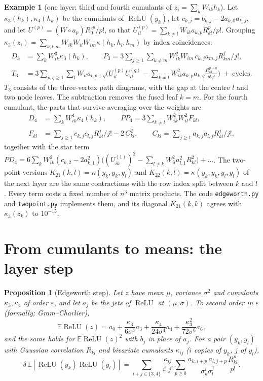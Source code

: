 \documentclass[11pt]{article}
\newtheorem{proposition}[theorem]{Proposition}
\theoremstyle{definition}
\newtheorem{example}[theorem]{Example}
\theoremstyle{remark}
\newcommand{\E}{\mathbb E}
\newcommand{\relu}{\operatorname{ReLU}}
\begin{document}
\begin{example}[one layer: third and fourth cumulants of $z_i=\sum_kW_{ik}h_k$]\label{ex:k3k4}
Let $\kappa_3(h_k),\kappa_4(h_k)$ be the cumulants of $\relu(y_k)$, let $c_{k,j}=b_{k,j}-2a_{k,0}a_{k,j}$, and let $U^{(p)}=(W\circ a_p)R_0^{\circ p}/p!$, so that $U^{(p)}_{il}=\sum_{k\ne l}W_{ik}a_{k,p}R_{kl}^p/p!$. Grouping $\kappa_3(z_i)=\sum_{k,l,m}W_{ik}W_{il}W_{im}\kappa(h_k,h_l,h_m)$ by index coincidences:
\begin{align*}
D_3&=\textstyle\sum_kW_{ik}^3\kappa_3(h_k),\qquad
P_3=3\sum_{j\ge1}\sum_{k\ne m}W_{ik}^2W_{im}\,c_{k,j}a_{m,j}R_{km}^j/j!,\\
T_3&=\textstyle 3\sum_{p,q\ge1}\sum_lW_{il}a_{l,p+q}\Big(U^{(p)}_{il}U^{(q)}_{il}-\sum_{k\ne l}W_{ik}^2a_{k,p}a_{k,q}\frac{R_{kl}^{p+q}}{p!q!}\Big)\ +\ \text{cycles}.
\end{align*}
$T_3$ consists of the three-vertex path diagrams, with the gap at the centre $l$ and two node leaves. The subtraction removes the fused leaf $k=m$. For the fourth cumulant, the parts that survive averaging over the weights are
\begin{align*}
D_4&=\textstyle\sum_kW_{ik}^4\kappa_4(h_k),\qquad PP_4=3\sum_{k\ne l}W_{ik}^2W_{il}^2F_{kl},\\
F_{kl}&=\textstyle\sum_{j\ge1}c_{k,j}c_{l,j}R_{kl}^j/j!-2\,C_{kl}^2,\qquad C_{kl}=\sum_{j\ge1}a_{k,j}a_{l,j}R_{kl}^j/j!,
\end{align*}
together with the star term $PD_4=6\sum_kW_{ik}^2(c_{k,2}-2a_{k,1}^2)\big((U^{(1)}_{ik})^2-\sum_{l\ne k}W_{il}^2a_{l,1}^2R_{kl}^2\big)+\dots$. The two-point versions $K_{21}(k,l)=\kappa(y_k,y_k,y_l)$ and $K_{22}(k,l)=\kappa(y_k,y_k,y_l,y_l)$ of the next layer are the same contractions with the row index split between $k$ and $l$. Every term costs a fixed number of $n^3$ matrix products. The code \texttt{edgeworth.py} and \texttt{twopoint.py} implements them, and its diagonal $K_{21}(k,k)$ agrees with $\kappa_3(z_k)$ to $10^{-15}$.
\end{example}

\section{From cumulants to means: the layer step}\label{sec:step}

\begin{proposition}[Edgeworth step]\label{prop:edge}
Let $z$ have mean $\mu$, variance $\sigma^2$ and cumulants $\kappa_3,\kappa_4$ of order $\varepsilon$, and let $a_j$ be the jets of $\relu$ at $(\mu,\sigma)$. To second order in $\varepsilon$ (formally; Gram--Charlier),
\[
\E\relu(z)=a_0+\frac{\kappa_3}{6\sigma^3}a_3+\frac{\kappa_4}{24\sigma^4}a_4+\frac{\kappa_3^2}{72\sigma^6}a_6,
\]
and the same holds for $\E\relu(z)^2$ with $b_j$ in place of $a_j$. For a pair $(y_k,y_l)$ with Gaussian correlation $R_{kl}$ and bivariate cumulants $\kappa_{ij}$ ($i$ copies of $y_k$, $j$ of $y_l$),
\[
\delta\,\E[\relu(y_k)\relu(y_l)]=\sum_{i+j\in\{3,4\}}\frac{\kappa_{ij}}{i!\,j!}\sum_{p\ge0}\frac{a_{k,i+p}\,a_{l,j+p}}{\sigma_k^i\sigma_l^j}\frac{R_{kl}^p}{p!}.
\]
\end{proposition}
\end{document}
